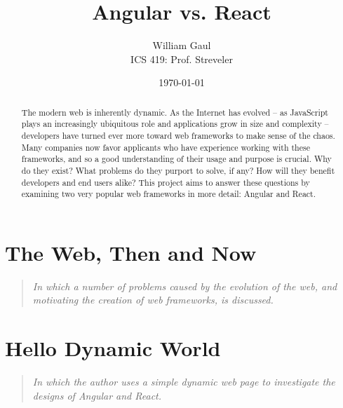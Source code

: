\documentclass[12pt,letterpaper]{article}
\title{\textbf{Angular vs. React}}
\author{William Gaul\\{ICS 419: Prof. Streveler}}
\date{\today}
\begin{document}
\maketitle

\begin{singlespace*}
\begin{abstract}
	The modern web is inherently dynamic. As the Internet has evolved -- as JavaScript plays an increasingly ubiquitous role and applications grow in size and complexity -- developers have turned ever more toward web frameworks to make sense of the chaos. Many companies now favor applicants who have experience working with these frameworks, and so a good understanding of their usage and purpose is crucial. Why do they exist? What problems do they purport to solve, if any? How will they benefit developers and end users alike? This project aims to answer these questions by examining two very popular web frameworks in more detail: Angular and React.
\end{abstract}
\end{singlespace*}


\section{The Web, Then and Now}
\vspace{-12pt}

\begin{quote}
	\singlespacing
	\emph{In which a number of problems caused by the evolution of the web, and motivating the creation of web frameworks, is discussed.}
\end{quote}




\cite{Schlensker:2014}
\cite{Angular:Docs}
\cite{Hunt:2013}
\cite{Green:2013}
\cite{Hunt:2014}




\section{Hello Dynamic World}
\vspace{-12pt}

\begin{quote}
	\singlespacing
	\emph{In which the author uses a simple dynamic web page to investigate the designs of Angular and React.}
\end{quote}
\end{document}
